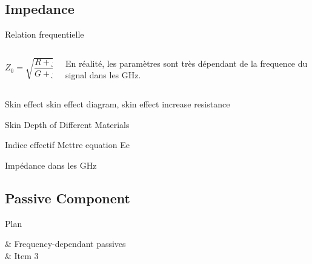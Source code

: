 \subsection[6min-Max]{Impedance }
\maxbackground


\begin{frame}{Relation frequentielle}
    \begin{columns}
        \begin{column}{0.33\textwidth}
            \begin{center}
            $Z_0 = \sqrt{\dfrac{R + j \omega L}{G + j \omega C}}$\\
            \end{center}
        \end{column}
        \begin{column}{0.66\textwidth}
            En réalité, les paramètres sont très dépendant de la frequence du signal dans les GHz.
        \end{column}
    \end{columns}
    \vspace{30pt}
\end{frame}

\begin{frame}{Skin effect}
    skin effect diagram, skin effect increase resistance
\end{frame}

\begin{frame}{Skin Depth of Different Materials}

\end{frame}

\begin{frame}{Indice effectif}
    Mettre equation Ee
\end{frame}

\begin{frame}{Impédance dans les GHz}
\end{frame}




\subsection[5min-Pascal]{Passive Component }
\pascalbackground
\begin{frame}{Plan}
    \begin{makelist}[\small][1.5]
        \icon[red]{\faTimes} & Frequency-dependant passives\\
        \icon[red]{\faTimes} & Item 3
    \end{makelist}
\end{frame}


